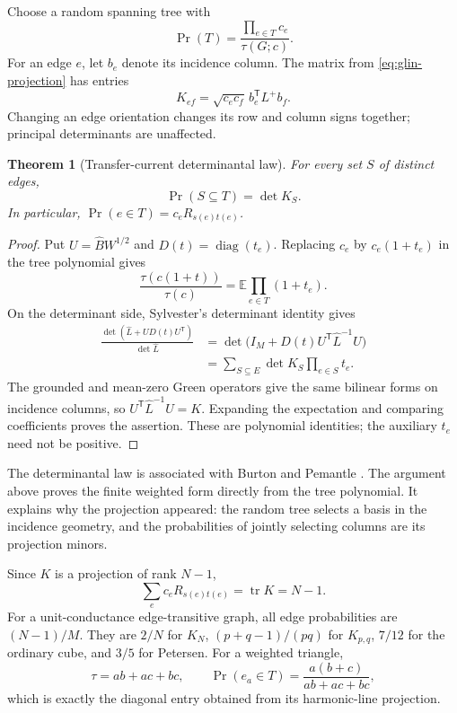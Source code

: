 \documentclass[11pt]{article}
\newtheorem{theorem}{Theorem}[section]
\theoremstyle{definition}
\theoremstyle{remark}
\begin{document}
Choose a random spanning tree with
\[
 \Pr(T)=\frac{\prod_{e\in T}c_e}{\tau(G;c)}.
\]
For an edge $e$, let $b_e$ denote its incidence column. The matrix from \eqref{eq:glin-projection} has entries
\[
 K_{ef}=\sqrt{c_ec_f}\,b_e^{\mathsf T}L^+b_f.
\]
Changing an edge orientation changes its row and column signs together; principal determinants are unaffected.

\begin{theorem}[Transfer-current determinantal law]\label{thm:glin-transfer-current}
For every set $S$ of distinct edges,
\begin{equation}\label{eq:glin-dpp}
 \Pr(S\subseteq T)=\det K_S.
\end{equation}
In particular, $\Pr(e\in T)=c_eR_{s(e)t(e)}$.
\end{theorem}
\begin{proof}
Put $U=\widehat B W^{1/2}$ and $D(t)=\operatorname{diag}(t_e)$. Replacing $c_e$ by $c_e(1+t_e)$ in the tree polynomial gives
\[
 \frac{\tau(c(1+t))}{\tau(c)}
 =\mathbb E\prod_{e\in T}(1+t_e).
\]
On the determinant side, Sylvester's determinant identity gives
\begin{align*}
 \frac{\det(\widehat L+UD(t)U^{\mathsf T})}{\det\widehat L}
 &=\det\bigl(I_M+D(t)U^{\mathsf T}\widehat L^{-1}U\bigr)\\
 &=\sum_{S\subseteq E}\det K_S\prod_{e\in S}t_e.
\end{align*}
The grounded and mean-zero Green operators give the same bilinear forms on incidence columns, so $U^{\mathsf T}\widehat L^{-1}U=K$. Expanding the expectation and comparing coefficients proves the assertion. These are polynomial identities; the auxiliary $t_e$ need not be positive.
\end{proof}

The determinantal law is associated with Burton and Pemantle \cite{glinBurtonPemantle1993}. The argument above proves the finite weighted form directly from the tree polynomial. It explains why the projection appeared: the random tree selects a basis in the incidence geometry, and the probabilities of jointly selecting columns are its projection minors.

Since $K$ is a projection of rank $N-1$,
\begin{equation}\label{eq:glin-foster}
 \sum_e c_eR_{s(e)t(e)}=\operatorname{tr}K=N-1.
\end{equation}
For a unit-conductance edge-transitive graph, all edge probabilities are $(N-1)/M$. They are $2/N$ for $K_N$, $(p+q-1)/(pq)$ for $K_{p,q}$, $7/12$ for the ordinary cube, and $3/5$ for Petersen. For a weighted triangle,
\[
 \tau=ab+ac+bc,\qquad
 \Pr(e_a\in T)=\frac{a(b+c)}{ab+ac+bc},
\]
which is exactly the diagonal entry obtained from its harmonic-line projection.
\end{document}
